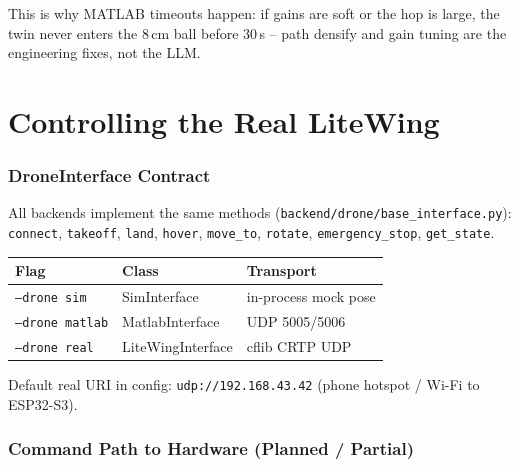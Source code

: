 \documentclass[11pt,a4paper]{article}
\begin{document}
This is why MATLAB timeouts happen: if gains are soft or the hop is large, the twin never
enters the $8$\,cm ball before 30\,s -- path densify and gain tuning are the engineering fixes,
not the LLM.

\part{Controlling the Real LiteWing}

\section{DroneInterface Contract}

All backends implement the same methods
(\texttt{backend/drone/base\_interface.py}):
\texttt{connect}, \texttt{takeoff}, \texttt{land}, \texttt{hover}, \texttt{move\_to},
\texttt{rotate}, \texttt{emergency\_stop}, \texttt{get\_state}.

\begin{center}
\small
\begin{tabular}{lll}
\toprule
\textbf{Flag} & \textbf{Class} & \textbf{Transport} \\
\midrule
\texttt{--drone sim} & SimInterface & in-process mock pose \\
\texttt{--drone matlab} & MatlabInterface & UDP 5005/5006 \\
\texttt{--drone real} & LiteWingInterface & cflib CRTP UDP \\
\bottomrule
\end{tabular}
\end{center}

Default real URI in config: \texttt{udp://192.168.43.42} (phone hotspot / Wi-Fi to ESP32-S3).

\section{Command Path to Hardware (Planned / Partial)}

\begin{center}
\end{center}
\end{document}
